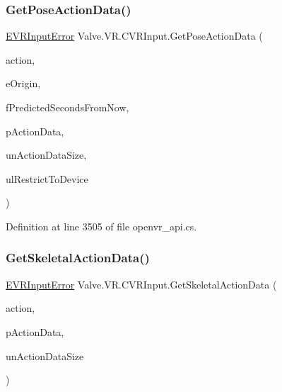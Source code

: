 \subsubsection{\texorpdfstring{GetPoseActionData()}{GetPoseActionData()}}
{\footnotesize\ttfamily \mbox{\hyperlink{namespace_valve_1_1_v_r_a592d7f4189b8346d6c96dbdbaa35bc1b}{E\+V\+R\+Input\+Error}} Valve.\+V\+R.\+C\+V\+R\+Input.\+Get\+Pose\+Action\+Data (\begin{DoxyParamCaption}\item[{ulong}]{action,  }\item[{\mbox{\hyperlink{namespace_valve_1_1_v_r_a29be99a3c2f780157bd490db06a7f12f}{E\+Tracking\+Universe\+Origin}}}]{e\+Origin,  }\item[{float}]{f\+Predicted\+Seconds\+From\+Now,  }\item[{ref \mbox{\hyperlink{struct_valve_1_1_v_r_1_1_input_pose_action_data__t}{Input\+Pose\+Action\+Data\+\_\+t}}}]{p\+Action\+Data,  }\item[{uint}]{un\+Action\+Data\+Size,  }\item[{ulong}]{ul\+Restrict\+To\+Device }\end{DoxyParamCaption})}



Definition at line 3505 of file openvr\+\_\+api.\+cs.

\mbox{\label{class_valve_1_1_v_r_1_1_c_v_r_input_a98350a9bdb1877c5943da40d2b9b2927}} 
\subsubsection{\texorpdfstring{GetSkeletalActionData()}{GetSkeletalActionData()}}
{\footnotesize\ttfamily \mbox{\hyperlink{namespace_valve_1_1_v_r_a592d7f4189b8346d6c96dbdbaa35bc1b}{E\+V\+R\+Input\+Error}} Valve.\+V\+R.\+C\+V\+R\+Input.\+Get\+Skeletal\+Action\+Data (\begin{DoxyParamCaption}\item[{ulong}]{action,  }\item[{ref \mbox{\hyperlink{struct_valve_1_1_v_r_1_1_input_skeletal_action_data__t}{Input\+Skeletal\+Action\+Data\+\_\+t}}}]{p\+Action\+Data,  }\item[{uint}]{un\+Action\+Data\+Size }\end{DoxyParamCaption})}



